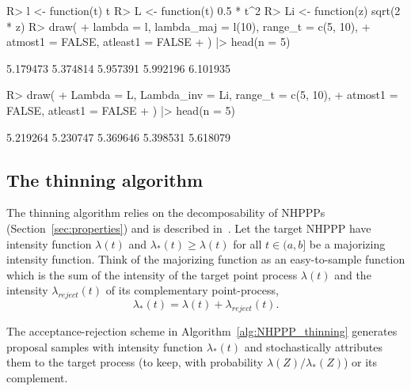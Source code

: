 \documentclass[10pt,letterpaper]{article}
\begin{document}
\begin{Schunk}
\begin{Sinput}
R> l <- function(t) t
R> L <- function(t) 0.5 * t^2
R> Li <- function(z) sqrt(2 * z)
R> draw(
+    lambda = l, lambda_maj = l(10), range_t = c(5, 10),
+    atmost1 = FALSE, atleast1 = FALSE
+  ) |> head(n = 5)
\end{Sinput}
\begin{Soutput}
[1] 5.179473 5.374814 5.957391 5.992196 6.101935
\end{Soutput}
\begin{Sinput}
R> draw(
+    Lambda = L, Lambda_inv = Li, range_t = c(5, 10),
+    atmost1 = FALSE, atleast1 = FALSE
+  ) |> head(n = 5)
\end{Sinput}
\begin{Soutput}
[1] 5.219264 5.230747 5.369646 5.398531 5.618079
\end{Soutput}
\end{Schunk}

\subsection{The thinning algorithm}\label{sec:thinning}
The thinning algorithm relies on the decomposability of NHPPPs (Section~\ref{sec:properties}) and is described in~\cite{lewis1979thinning}. Let the target NHPPP have intensity function $\lambda(t)$ and $\lambda_*(t) \ge \lambda(t)$ for all $t \in (a, b]$ be a majorizing intensity function. Think of the majorizing function as an easy-to-sample function which is the sum of the intensity of the target point process $\lambda(t)$ and the intensity $\lambda_{reject}(t)$ of its complementary point-process,
$$\lambda_*(t) = \lambda(t) + \lambda_{reject}(t).$$

The acceptance-rejection scheme in Algorithm~\ref{alg:NHPPP_thinning} generates proposal samples with intensity function $\lambda_*(t)$ and stochastically attributes them to the target process (to keep, with probability $\lambda(Z)/\lambda_*(Z)$) or its complement.
\end{document}
